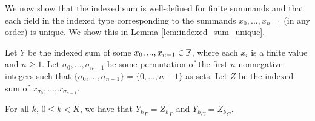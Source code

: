       We now show that the indexed sum is well-defined for finite summands and that each field in the indexed type corresponding to the summands $x_0, ..., x_{n - 1}$ (in any order) is unique. We show this in Lemma \ref{lem:indexed_sum_unique}.
      \begin{samepage}
      \begin{lem}
        Let $Y$ be the indexed sum of some $x_0, ..., x_{n - 1} \in \mathbb{F}$, where each $x_i$ is a finite value and $n \geq 1$.
        Let $\sigma_0, ..., \sigma_{n - 1}$ be some permutation of the first $n$ nonnegative integers such that $\{\sigma_0, ..., \sigma_{n - 1}\} = \{0, ..., n - 1\}$ as sets.
        Let $Z$ be the indexed sum of $x_{\sigma_0}, ..., x_{\sigma_{n - 1}}$.

        For all $k$, $0 \leq k < K$, we have that ${Y_k}_P = {Z_k}_P$ and ${Y_k}_C = {Z_k}_C$.
        \label{lem:indexed_sum_unique}
      \end{lem}
      \end{samepage}

